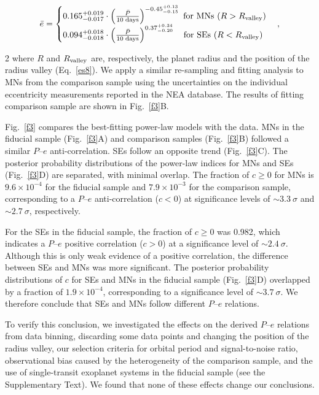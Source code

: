 \documentclass[10pt]{article}
\begin{document}
\begin{equation}
\bar{e} =
\begin{cases}
0.165^{+0.019}_{-0.017}\cdot\left(\frac{\bar{P}}{10\;{\rm days}}\right)^{-0.45^{+0.13}_{-0.15}} {\rm ~for~MNs~} (R>R_{\rm valley}) \\
0.094^{+0.018}_{-0.018}\cdot\left(\frac{\bar{P}}{10\;{\rm days}}\right)^{0.37^{+0.34}_{-0.20}} {\rm ~~~for~SEs~} (R<R_{\rm valley})
\end{cases}
,
\end{equation}
\begin{multicols}{2}
\noindent where $R$ and $R_{\rm  valley}$ are, respectively, the planet radius and the position of the radius valley (Eq.~\ref{es8}).
We apply a similar re-sampling and fitting analysis to MNs from the comparison sample\cite{methods} using the uncertainties on the individual eccentricity measurements reported in the NEA database\cite{NEA2024}.
The results of fitting comparison sample are shown in Fig.~\ref{f3}B.

Fig.~\ref{f3} compares the best-fitting power-law models with the data.
MNs in the fiducial sample (Fig.~\ref{f3}A) and comparison samples (Fig.~\ref{f3}B) followed a similar $P$--$e$ anti-correlation.
SEs follow an opposite trend (Fig.~\ref{f3}C).
The posterior probability distributions of the power-law indices for MNs and SEs (Fig.~\ref{f3}D) are separated, with minimal overlap.
The fraction of $c \geq 0$ for MNs is $9.6 \times 10^{-4}$ for the fiducial sample and $7.9 \times 10^{-3}$ for the comparison sample, corresponding to a $P$--$e$ anti-correlation ($c < 0$) at significance levels of $\sim3.3~\sigma$ and $\sim2.7~\sigma$, respectively.

For the SEs in the fiducial sample, the fraction of $c \geq 0$ was 0.982, which indicates a $P$--$e$ positive correlation ($c > 0$) at a significance level of $\sim2.4~\sigma$.
Although this is only weak evidence of a positive correlation, the difference between SEs and MNs was more significant.
The posterior probability distributions of $c$ for SEs and MNs in the fiducial sample (Fig.~\ref{f3}D) overlapped by a fraction of $1.9 \times 10^{-4}$, corresponding to a significance level of $\sim 3.7~\sigma$.
We therefore conclude that SEs and MNs follow different $P$--$e$ relations.

To verify this conclusion, we investigated the effects on the derived $P$--$e$ relations from data binning\cite{methods}, discarding some data points and changing the position of the radius valley, our selection criteria for orbital period and signal-to-noise ratio, observational bias caused by the heterogeneity of the comparison sample, and the use of single-transit exoplanet systems in the fiducial sample (see the Supplementary Text).
We found that none of these effects change our conclusions.


\end{multicols}
\end{document}
